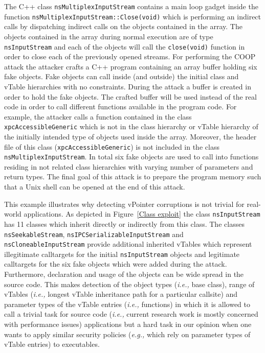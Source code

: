 The C++ class \texttt{nsMultiplexInputStream} contains a main loop gadget inside the function 
\texttt{nsMultiplexInputStream::Close(void)} which is performing an indirect calls by dispatching
indirect calls on the objects contained in the array. 
The objects contained in the array during normal execution are of type \texttt{nsInputStream} and each
of the objects will call the \texttt{close(void)} function in order to close each of the previously opened streams.
For performing the COOP attack the attacker crafts a C++ program containing an array buffer holding 
six fake objects. Fake objects can call inside (and outside) the initial class and vTable hierarchies
with no constraints.
During the attack a buffer is created in order to hold the fake objects.
The crafted buffer will be used instead of the real code in order to call different functions
available in the program code. For example, the attacker calls a function contained in the class
\texttt{xpcAccessibleGeneric} which is not in the class hierarchy or vTable hierarchy
of the initially intended type of objects used inside the array.
Moreover, the header file of this class (\texttt{xpcAccessibleGeneric}) is not included in the 
class \texttt{nsMultiplexInputStream}.
In total six fake objects are used to call into functions residing in not related class hierarchies with varying 
number of parameters and return types. The final goal of this attack is to prepare the program memory such 
that a Unix shell can be opened at the end of this attack.

This example illustrates why detecting vPointer corruptions is not trivial for real-world applications.
As depicted in Figure~\ref{Class exploit} the class \texttt{nsInputStream} has 11 classes which inherit directly
or indirectly from this class. The classes \texttt{nsSeekableStream}, \texttt{nsIPCSerializableInputStream}
and \texttt{nsCloneableInputStream} provide additional inherited vTables which represent illegitimate calltargets
for the initial \texttt{nsInputStream} objects and legitimate calltargets for the six fake objects which were added during the attack.
Furthermore, declaration and usage of the objects can be wide spread in the source code. This makes
detection of the object types (\textit{i.e.,} base class), range of vTables (\textit{i.e.,} longest vTable inheritance path for a particular callsite)
and parameter types of the vTable entries (\textit{i.e.,} functions) in which it is allowed to call a 
trivial task for source code (\textit{i.e.,} current research work is mostly concerned with performance issues)
applications but a hard task in our opinion when one wants to apply similar security policies 
(\textit{e.g.,} which rely on parameter types of vTable entries) to executables.





